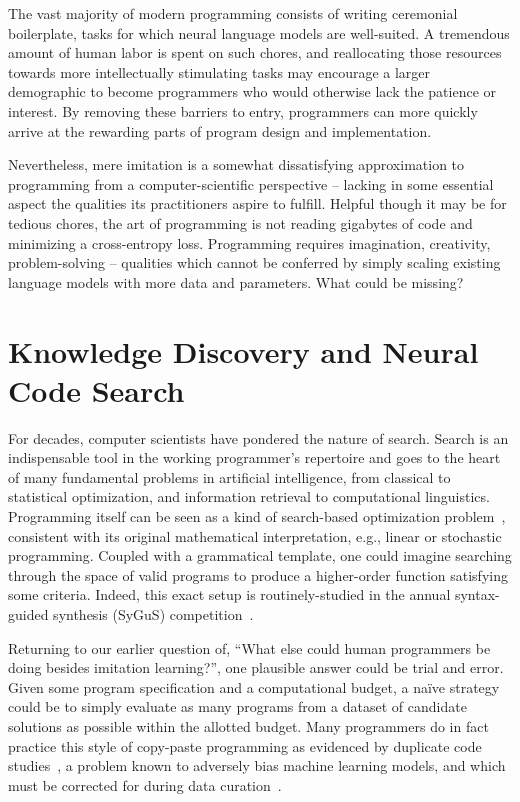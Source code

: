 \documentclass[10pt]{article}
\begin{document}
The vast majority of modern programming consists of writing ceremonial boilerplate, tasks for which neural language models are well-suited. A tremendous amount of human labor is spent on such chores, and reallocating those resources towards more intellectually stimulating tasks may encourage a larger demographic to become programmers who would otherwise lack the patience or interest. By removing these barriers to entry, programmers can more quickly arrive at the rewarding parts of program design and implementation.

Nevertheless, mere imitation is a somewhat dissatisfying approximation to programming from a computer-scientific perspective -- lacking in some essential aspect the qualities its practitioners aspire to fulfill. Helpful though it may be for tedious chores, the art of programming is not reading gigabytes of code and minimizing a cross-entropy loss. Programming requires imagination, creativity, problem-solving -- qualities which cannot be conferred by simply scaling existing language models with more data and parameters. What could be missing?

\section{Knowledge Discovery and Neural Code Search}

For decades, computer scientists have pondered the nature of search. Search is an indispensable tool in the working programmer's repertoire and goes to the heart of many fundamental problems in artificial intelligence, from classical to statistical optimization, and information retrieval to computational linguistics. Programming itself can be seen as a kind of search-based optimization problem~\cite{alur2018search}, consistent with its original mathematical interpretation, e.g., linear or stochastic programming. Coupled with a grammatical template, one could imagine searching through the space of valid programs to produce a higher-order function satisfying some criteria. Indeed, this exact setup is routinely-studied in the annual syntax-guided synthesis (SyGuS) competition~\cite{alur2016sygus}.

Returning to our earlier question of, ``What else could human programmers be doing besides imitation learning?'', one plausible answer could be trial and error. Given some program specification and a computational budget, a naïve strategy could be to simply evaluate as many programs from a dataset of candidate solutions as possible within the allotted budget. Many programmers do in fact practice this style of copy-paste programming as evidenced by duplicate code studies~\cite{lopes2017dejavu}, a problem known to adversely bias machine learning models, and which must be corrected for during data curation~\cite{allamanis2019adverse}.
\end{document}
